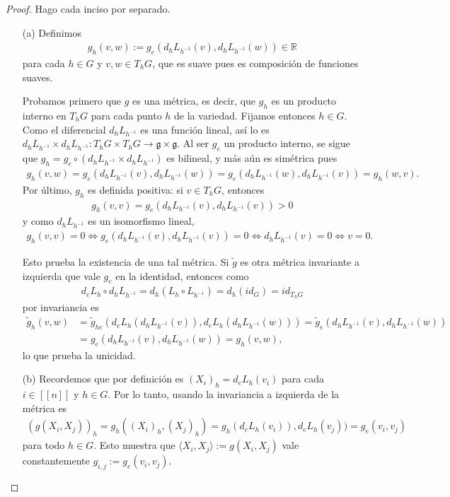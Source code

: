 \documentclass[11pt]{article}
\newcommand{\R}{\mathbb{R}}
\newcommand{\nat}[1]{[\![#1]\!]}
\newcommand{\ip}[1]{\langle #1 \rangle}
\begin{document}
\begin{proof} Hago cada inciso por separado. 
\begin{itemize}[listparindent = \parindent]
\item[(a)] Definimos
\begin{align*}
g_h(v,w) := g_e(d_hL_{h^{-1}}(v),d_hL_{h^{-1}}(w)) \in \R
\end{align*}
para cada $h \in G$ y $v,w \in T_hG$, que es suave pues es composición de funciones suaves.  

Probamos primero que $g$ es una métrica, es decir, que $g_h$ es un producto interno en $T_hG$ para cada punto $h$ de la variedad. Fijamos entonces $h \in G$. Como el diferencial $d_hL_{h^{-1}}$ es una función lineal, así lo es $d_hL_{h^{-1}} \times d_hL_{h^{-1}} : T_hG \times T_hG \to \mathfrak{g} \times \mathfrak{g}$. Al ser $g_e$ un producto interno, se sigue que $g_h = g_e \circ (d_hL_{h^{-1}} \times d_hL_{h^{-1}})$ es bilineal, y más aún es simétrica pues 
\begin{align*}
g_h(v,w) = g_e(d_hL_{h^{-1}}(v),d_hL_{h^{-1}}(w)) = g_e(d_hL_{h^{-1}}(w),d_hL_{h^{-1}}(v)) = g_h(w,v).
\end{align*}
Por último, $g_h$ es definida positiva: si $v \in T_hG$, entonces
\begin{align*}
g_h(v,v) = g_e(d_hL_{h^{-1}}(v),d_hL_{h^{-1}}(v)) > 0
\end{align*}
y como $d_hL_{h^{-1}}$ es un isomorfismo lineal,
\begin{align*}
g_h(v,v) = 0\iff g_e(d_hL_{h^{-1}}(v),d_hL_{h^{-1}}(v)) = 0 \iff d_hL_{h^{-1}}(v) = 0\iff v = 0.
\end{align*}

Esto prueba la existencia de una tal métrica. Si $\widetilde{g}$ es otra métrica invariante a izquierda que vale $g_e$ en la identidad, entonces como
\begin{align*}
d_eL_h \circ d_hL_{h^{-1}} = d_h(L_h \circ L_{h^{-1}}) = d_h(id_G) = id_{T_hG} 
\end{align*}
por invariancia es
\begin{align*}
\widetilde{g}_h(v,w) &= \widetilde{g}_{he}(d_eL_h(d_hL_{h^{-1}}(v)),d_eL_h(d_hL_{h^{-1}}(w)))= \widetilde{g}_e(d_hL_{h^{-1}}(v),d_hL_{h^{-1}}(w))\\&= g_e(d_hL_{h^{-1}}(v),d_hL_{h^{-1}}(w)) = g_h(v,w),
\end{align*}
lo que prueba la unicidad.
\item[(b)] Recordemos que por definición es $(X_i)_h = d_eL_h(v_i)$ para cada $i \in \nat{n}$ y $h \in G$. Por lo tanto, usando la invariancia a izquierda de la métrica es
\begin{align*}
(g(X_i,X_j))_h = g_h((X_i)_h,(X_j)_h) = g_h(d_eL_h(v_i)),d_eL_h(v_j)) = g_e(v_i,v_j)
\end{align*}
para todo $h \in G$. Esto muestra que $\ip{X_i,X_j} := g(X_i,X_j)$ vale constantemente $g_{i,j} := g_e(v_i,v_j)$. 


\end{itemize}
\end{proof}
\end{document}
